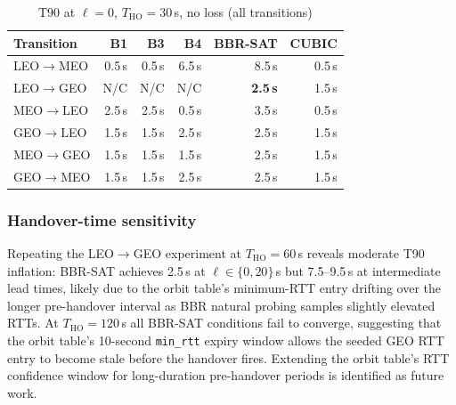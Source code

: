 \begin{table}[t]
\centering
\caption{T90 at $\ell = 0$, $T_\mathrm{HO} = 30$\,s, no loss (all transitions)}
\label{tab:exp1_all_transitions}
\small
\setlength{\tabcolsep}{4pt}
\begin{tabular}{lrrrrr}
\toprule
Transition & B1 & B3 & B4 & BBR-SAT & CUBIC \\
\midrule
LEO$\to$MEO  & 0.5\,s & 0.5\,s & 6.5\,s & 8.5\,s  & 0.5\,s \\
LEO$\to$GEO  & N/C    & N/C    & N/C    & \textbf{2.5\,s} & 1.5\,s \\
MEO$\to$LEO  & 2.5\,s & 2.5\,s & 0.5\,s & 3.5\,s  & 0.5\,s \\
GEO$\to$LEO  & 1.5\,s & 1.5\,s & 2.5\,s & 2.5\,s  & 1.5\,s \\
MEO$\to$GEO  & 1.5\,s & 1.5\,s & 1.5\,s & 2.5\,s  & 1.5\,s \\
GEO$\to$MEO  & 1.5\,s & 1.5\,s & 2.5\,s & 2.5\,s  & 1.5\,s \\
\bottomrule
\end{tabular}
\end{table}

\subsubsection{Handover-time sensitivity}

Repeating the LEO$\to$GEO experiment at $T_\mathrm{HO} = 60$\,s reveals
moderate T90 inflation: BBR-SAT achieves 2.5\,s at $\ell \in \{0, 20\}$\,s
but 7.5--9.5\,s at intermediate lead times, likely due to the orbit table's
minimum-RTT entry drifting over the longer pre-handover interval as
BBR natural probing samples slightly elevated RTTs.
At $T_\mathrm{HO} = 120$\,s all BBR-SAT conditions fail to converge,
suggesting that the orbit table's 10-second \texttt{min\_rtt} expiry window
allows the seeded GEO RTT entry to become stale before the handover fires.
Extending the orbit table's RTT confidence window for long-duration pre-handover
periods is identified as future work.
